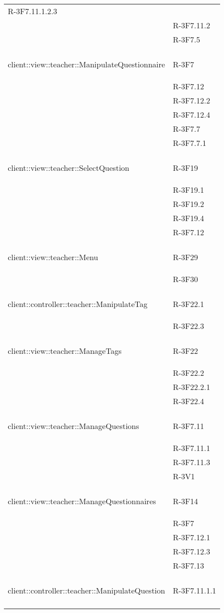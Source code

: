 \begin{longtable}{l p{3cm}}
R-3F7.11.1.2.3 \tabularnewline &

R-3F7.11.2 \tabularnewline &

R-3F7.5 \tabularnewline &\tabularnewline
\midrule
\hypertarget{client::view::teacher::ManipulateQuestionnaire}{client::view::teacher::ManipulateQuestionnaire} & R-3F7 \tabularnewline &

R-3F7.12 \tabularnewline &

R-3F7.12.2 \tabularnewline &

R-3F7.12.4 \tabularnewline &

R-3F7.7 \tabularnewline &

R-3F7.7.1 \tabularnewline &\tabularnewline
\midrule
\hypertarget{client::view::teacher::SelectQuestion}{client::view::teacher::SelectQuestion} & R-3F19 \tabularnewline &

R-3F19.1 \tabularnewline &

R-3F19.2 \tabularnewline &

R-3F19.4 \tabularnewline &

R-3F7.12 \tabularnewline &\tabularnewline
\midrule
\hypertarget{client::view::teacher::Menu}{client::view::teacher::Menu} & R-3F29 \tabularnewline &

R-3F30 \tabularnewline &\tabularnewline
\midrule
\hypertarget{client::controller::teacher::ManipulateTag}{client::controller::teacher::ManipulateTag} & R-3F22.1 \tabularnewline &

R-3F22.3 \tabularnewline &\tabularnewline
\midrule
\hypertarget{client::view::teacher::ManageTags}{client::view::teacher::ManageTags} & R-3F22 \tabularnewline &

R-3F22.2 \tabularnewline &

R-3F22.2.1 \tabularnewline &

R-3F22.4 \tabularnewline &\tabularnewline
\midrule
\hypertarget{client::view::teacher::ManageQuestions}{client::view::teacher::ManageQuestions} & R-3F7.11 \tabularnewline &

R-3F7.11.1 \tabularnewline &

R-3F7.11.3 \tabularnewline &

R-3V1 \tabularnewline &\tabularnewline
\midrule
\hypertarget{client::view::teacher::ManageQuestionnaires}{client::view::teacher::ManageQuestionnaires} & R-3F14 \tabularnewline &

R-3F7 \tabularnewline &

R-3F7.12.1 \tabularnewline &

R-3F7.12.3 \tabularnewline &

R-3F7.13 \tabularnewline &\tabularnewline
\midrule
\hypertarget{client::controller::teacher::ManipulateQuestion}{client::controller::teacher::ManipulateQuestion} & R-3F7.11.1.1 \tabularnewline &


\end{longtable}

